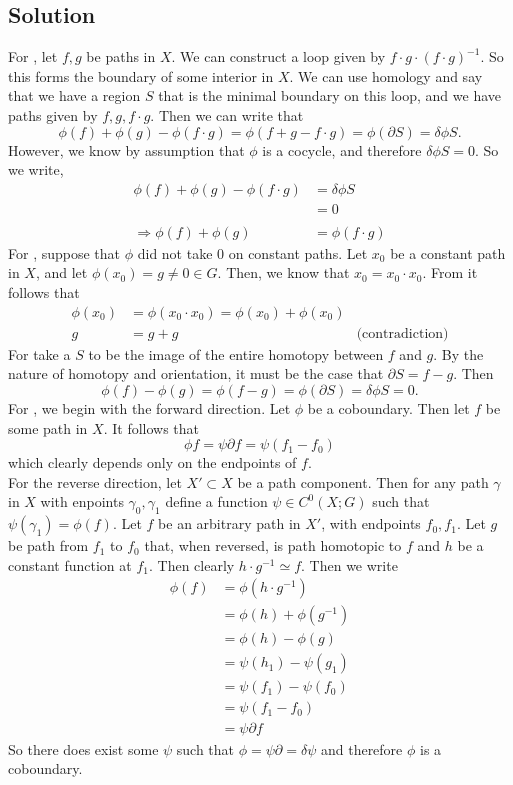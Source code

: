\documentclass{article}
\theoremstyle{definition}
\begin{document}
\subsection*{Solution}
For , let $f,g$ be paths in $X$.
We can construct a loop given by $f \cdot g \cdot (f \cdot g)^{-1}$.
So this forms the boundary of some interior in $X$.
We can use homology and say that we have a region $S$ that is the 
minimal boundary on this loop, and we have paths given by $f, g, f \cdot g$.
Then we can write that 
\[
    \phi(f) + \phi(g) - \phi(f \cdot g) = \phi(f + g - f\cdot g) = \phi(\partial S) = \delta \phi S
.\]
However, we know by assumption that $\phi$ is a cocycle, and therefore $\delta \phi S = 0$.
So we write,
\begin{align*}
    \phi(f) + \phi(g) - \phi(f \cdot g) &= \delta \phi S \\
    &= 0 \\\\
    \Longrightarrow \phi(f) + \phi(g) &= \phi(f \cdot g)
\end{align*}
For , suppose that $\phi$ did not take 0 on constant paths.
Let $x_0$ be a constant path in $X$, and let $\phi(x_0) = g \neq 0 \in G$.
Then, we know that $x_0 = x_0 \cdot x_0$. From  it follows that 
\begin{align*}
    \phi(x_0) &= \phi(x_0 \cdot x_0) = \phi(x_0) + \phi(x_0) \\
    g & = g+ g & \text{(contradiction)}
\end{align*}
For  take a $S$ to be the image of the entire homotopy between 
$f$ and $g$. By the nature of homotopy and orientation, it must be the case 
that $\partial S = f - g$. Then
\[
    \phi(f) - \phi(g) = \phi(f - g) = \phi(\partial S) = \delta \phi S = 0
.\]
For , we begin with the forward direction. Let $\phi$ be a coboundary.
Then let $f$  be some path in $X$. It follows that 
\[
    \phi f = \psi \partial f = \psi (f_1 - f_0)
\]
which clearly depends only on the endpoints of $f$.\\
For the reverse direction, let $X' \subset X$ be a path component.
Then for any path $\gamma$ in $X$ with enpoints $\gamma_0, \gamma_1$ define 
a function $\psi \in C^0(X;G)$ such that $\psi(\gamma_1) = \phi(f)$.
Let $f$ be an arbitrary path in $X'$, with endpoints $f_0,f_1$. Let $g$ be 
path from $f_1$ to $f_0$ that, when reversed, is path homotopic to $f$ and $h$ be a constant 
function at $f_1$. Then clearly $h \cdot g^{-1} \simeq f$.
Then we write 
\begin{align*}
    \phi(f) &= \phi(h \cdot g^{-1}) \\
    &=\phi(h) + \phi(g^{-1}) \\
    &=\phi(h) - \phi(g) \\
    &=\psi(h_1) - \psi(g_1) \\
    &= \psi(f_1) - \psi(f_0) \\
    &= \psi(f_1 - f_0) \\
    &= \psi \partial f
\end{align*}
So there does exist some $\psi$ such that $\phi = \psi \partial = \delta \psi$ and 
therefore $\phi$ is a coboundary.
\end{document}
